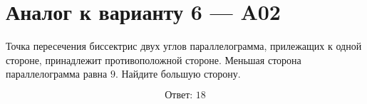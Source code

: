 


\section*{Аналог к варианту 6 — A02}
Точка пересечения биссектрис двух углов параллелограмма, прилежащих к одной стороне, принадлежит противоположной стороне. Меньшая сторона параллелограмма равна \(9\). Найдите большую сторону.
\begin{center}\figParallelogramTwoBisectors\end{center}
\[\boxed{\text{Ответ: }18}\]

